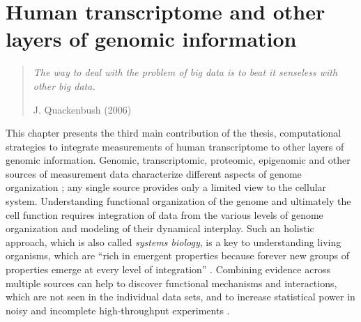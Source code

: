 \chapter{Human transcriptome and other layers of genomic information}\label{ch:integration}

\begin{quotation}
  \emph{The way to deal with the problem of big data is to beat it
    senseless with other big data.}
\begin{flushright}
J. Quackenbush (2006) %
\end{flushright}
\end{quotation}


This chapter presents the third main contribution of the thesis,
computational strategies to integrate measurements of human
transcriptome to other layers of genomic information.  Genomic,
transcriptomic, proteomic, epigenomic and other sources of measurement
data characterize different aspects of genome organization
\citep{Hawkins2010, Montaner2010, Sara2010}; any single source
provides only a limited view to the cellular system. Understanding
functional organization of the genome and ultimately the cell function
requires integration of data from the various levels of genome
organization and modeling of their dynamical interplay.  Such an
holistic approach, which is also called {\it systems biology}, is a
key to understanding living organisms, which are ``rich in emergent
properties because forever new groups of properties emerge at every
level of integration'' \citep{Mayr04}. Combining evidence across
multiple sources can help to discover functional mechanisms and
interactions, which are not seen in the individual data sets, and to
increase statistical power in noisy and incomplete high-throughput
experiments \citep{Huttenhower2010, Reed2006}.

